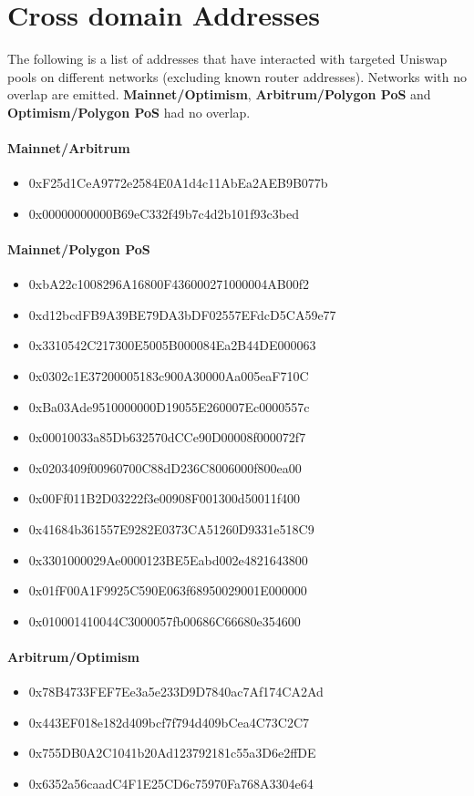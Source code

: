 \newpage
\chapter{Cross domain Addresses}
\label{APP:crossaddress}
The following is a list of addresses that have interacted with targeted Uniswap pools on different networks (excluding known router addresses). Networks with no overlap are emitted. \textbf{Mainnet/Optimism}, \textbf{Arbitrum/Polygon PoS} and \textbf{Optimism/Polygon PoS} had no overlap.

\subsubsection{Mainnet/Arbitrum}
\begin{itemize}
    \item 0xF25d1CeA9772e2584E0A1d4c11AbEa2AEB9B077b
    \item 0x00000000000B69eC332f49b7c4d2b101f93c3bed
\end{itemize}


\subsubsection{Mainnet/Polygon PoS}
\begin{itemize}
    \item 0xbA22c1008296A16800F436000271000004AB00f2
    \item 0xd12bcdFB9A39BE79DA3bDF02557EFdcD5CA59e77
    \item 0x3310542C217300E5005B000084Ea2B44DE000063
    \item 0x0302c1E37200005183c900A30000Aa005eaF710C
    \item 0xBa03Ade9510000000D19055E260007Ec0000557c
    \item 0x00010033a85Db632570dCCe90D00008f000072f7
    \item 0x0203409f00960700C88dD236C8006000f800ea00
    \item 0x00Ff011B2D03222f3e00908F001300d50011f400
    \item 0x41684b361557E9282E0373CA51260D9331e518C9
    \item 0x3301000029Ae0000123BE5Eabd002e4821643800
    \item 0x01fF00A1F9925C590E063f68950029001E000000
    \item 0x010001410044C3000057fb00686C66680e354600
\end{itemize}


\subsubsection{Arbitrum/Optimism}
\begin{itemize}
    \item 0x78B4733FEF7Ee3a5e233D9D7840ac7Af174CA2Ad
    \item 0x443EF018e182d409bcf7f794d409bCea4C73C2C7
    \item 0x755DB0A2C1041b20Ad123792181c55a3D6e2ffDE
    \item 0x6352a56caadC4F1E25CD6c75970Fa768A3304e64
\end{itemize}
